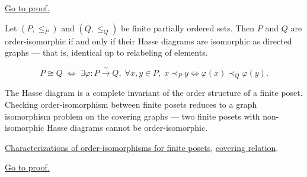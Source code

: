 \begin{remark*}[Proof]
\hyperref[prf:order-iso-finite-characterizations]{Go to proof.}
\end{remark*}


\begin{proposition}
\label{prop:hasse-diagram-characterization}
Let $(P, \leq_P)$ and $(Q, \leq_Q)$ be finite partially ordered sets.
Then $P$ and $Q$ are order-isomorphic if and only if their Hasse diagrams
are isomorphic as directed graphs — that is, identical up to relabeling
of elements.
\end{proposition}

\begin{remark*}
\[
P \cong Q
\;\Longleftrightarrow\;
\exists \varphi : P \xrightarrow{\;\sim\;} Q,\;
\forall x, y \in P,\;
x \prec_P y \Leftrightarrow \varphi(x) \prec_Q \varphi(y).
\]
\end{remark*}

\begin{remark*}[Interpretation]
The Hasse diagram is a complete invariant of the order structure of a
finite poset.  Checking order-isomorphism between finite posets reduces
to a graph isomorphism problem on the covering graphs — two finite posets
with non-isomorphic Hasse diagrams cannot be order-isomorphic.
\end{remark*}

\begin{remark*}[Dependencies]
\hyperref[lem:order-iso-finite-characterizations]{Characterizations of order-isomorphisms for finite posets},
\hyperref[def:covering-relation]{covering relation}.
\end{remark*}

\begin{remark*}[Proof]
\hyperref[prf:hasse-diagram-characterization]{Go to proof.}
\end{remark*}
